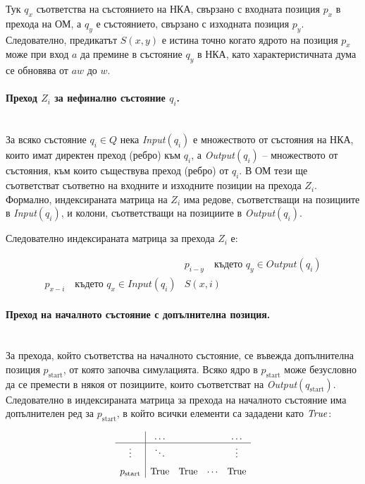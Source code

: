 Тук $q_x$ съответства на състоянието на НКА, свързано с входната позиция $p_x$ в прехода на ОМ, а $q_y$ е състоянието, свързано с изходната позиция $p_y$. Следователно, предикатът $S(x,y)$ е истина точно когато ядрото на позиция $p_x$ може при вход $a$ да премине в състояние $q_y$ в НКА, като характеристичната дума се обновява от $aw$ до $w$.


\paragraph{Преход $Z_i$ за нефинално състояние $q_i$.}
\mbox{}\\
За всяко състояние $q_i \in Q$ нека \textit{Input}$(q_i)$ е множеството от състояния на НКА, които имат директен преход (ребро) към $q_i$, а \textit{Output}$(q_i)$ – множеството от състояния, към които съществува преход (ребро) от $q_i$.  
В ОМ тези ще съответстват съответно на входните и изходните позиции на прехода $Z_i$.  
Формално, индексираната матрица на $Z_i$ има редове, съответстващи на позициите в \textit{Input}$(q_i)$, и колони, съответстващи на позициите в \textit{Output}$(q_i)$.

Следователно индексираната матрица за прехода $Z_i$ е:

\[
\begin{array}{c|c}
    & p_{i-y} \quad \text{където } q_y \in \textit{Output}(q_i) \\ \hline
p_{x-i} \quad \text{където } q_x \in \textit{Input}(q_i) & S(x,i)
\end{array}
\]


\paragraph{Преход на началното състояние с допълнителна позиция.}
\mbox{}\\
За прехода, който съответства на началното състояние, се въвежда допълнителна позиция $p_{\text{start}}$, от която започва симулацията.  
Всяко ядро в $p_{\text{start}}$ може безусловно да се премести в някоя от позициите, които съответстват на \textit{Output}$(q_{\text{start}})$.  
Следователно в индексираната матрица за прехода на началното състояние има допълнителен ред за $p_{\text{start}}$, в който всички елементи са зададени като $\text{\textit{True}}$:

\[
\resizebox{0.4\textwidth}{!}{$
\begin{array}{c|cccc}
    & \dots &   &   & \dots \\ \hline
\vdots & \ddots & & & \vdots \\[6pt]
p_{\text{start}} & \text{True} & \text{True} & \cdots & \text{True} \\
\end{array}
$}
\]

